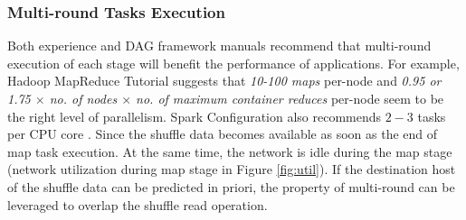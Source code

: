 \ifrevision
{}
\fi
\subsubsection{Multi-round Tasks Execution}\label{multi}
Both experience and DAG framework manuals recommend that multi-round execution of each stage will benefit the performance of applications.
For example, Hadoop MapReduce Tutorial \cite{hadooptutorial} suggests that \textit{10-100 maps} per-node and \textit{0.95 or 1.75 $\times$ no. of nodes $\times$ no. of maximum container reduces} per-node seem to be the right level of parallelism. 
Spark Configuration also recommends $2-3$ tasks per CPU core \cite{sparkconf}.
Since the shuffle data becomes available as soon as the end of map task execution. 
At the same time, the network is idle during the map stage (network utilization during map stage in Figure \ref{fig:util}). 
If the destination host of the shuffle data can be predicted in priori, the property of multi-round can be leveraged to overlap the shuffle read operation.

